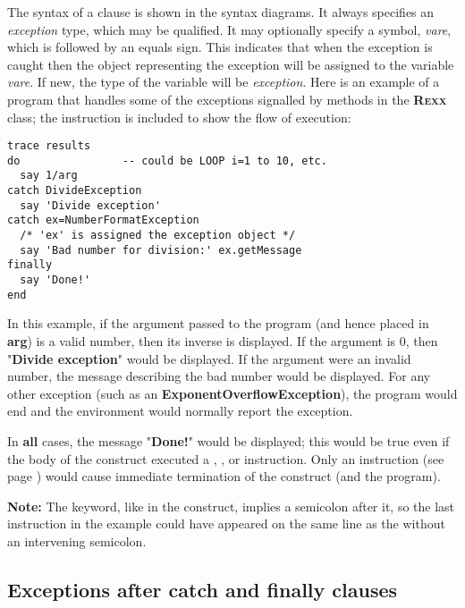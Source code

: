 The syntax of a  clause is shown in the syntax diagrams.
It always specifies an \emph{exception} type, which may be
qualified.  It may optionally specify a symbol, \emph{vare}, which
is followed by an equals sign.  This indicates that when the exception
is caught then the object representing the exception will be assigned to
the variable \emph{vare}.  If new, the type of the variable will be
\emph{exception}.
 Here is an example of a program that handles some of the exceptions
signalled by methods in the \textbf{R\textsc{exx}} class; the  instruction is included to show the flow of execution:
\begin{lstlisting}
trace results
do                -- could be LOOP i=1 to 10, etc.
  say 1/arg
catch DivideException
  say 'Divide exception'
catch ex=NumberFormatException
  /* 'ex' is assigned the exception object */
  say 'Bad number for division:' ex.getMessage
finally
  say 'Done!'
end
\end{lstlisting}
In this example, if the argument passed to the program (and hence
placed in \textbf{arg}) is a valid number, then its inverse is
displayed.  If the argument is 0, then "\textbf{Divide
exception}" would be displayed.  If the argument were an invalid
number, the message describing the bad number would be displayed.
For any other exception (such as an \textbf{ExponentOverflowException}),
the program would end and the environment would normally report the
exception.
 
In \textbf{all} cases, the message "\textbf{Done!}" would be
displayed; this would be true even if the body of the 
construct executed a , , or
 instruction.  Only an   instruction (see page \pageref{refexit}) would cause immediate termination of the construct (and
the program).
\begin{shaded}\noindent
\textbf{Note: }The  keyword, like  in the
 construct, implies a semicolon after it, so the last
 instruction in the example could have appeared on the same
line as the  without an intervening semicolon.
\end{shaded}\indent
\subsection{Exceptions after catch and finally clauses}
 
